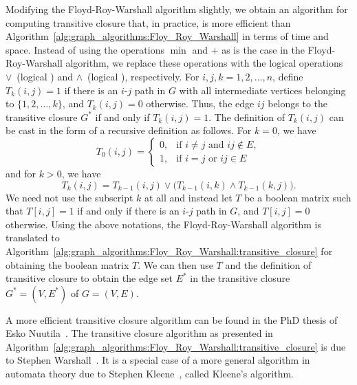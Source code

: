 Modifying the Floyd-Roy-Warshall algorithm slightly, we obtain an
algorithm for computing transitive closure that, in practice, is more
efficient than Algorithm~\ref{alg:graph_algorithms:Floy_Roy_Warshall}
in terms of time and space. Instead of using the operations $\min$ and
$+$ as is the case in the Floyd-Roy-Warshall algorithm, we replace
these operations with the logical operations $\vee$~(logical \OR) and
$\wedge$~(logical \AND), respectively. For $i,j,k = 1, 2, \dots, n$,
define $T_k(i,j) = 1$ if there is an $i$-$j$ path in $G$ with all
intermediate vertices belonging to $\{1, 2, \dots, k\}$, and
$T_k(i,j) = 0$ otherwise. Thus, the edge $ij$ belongs to the
transitive closure $G^*$ if and only if $T_k(i,j) = 1$. The definition
of $T_k(i,j)$ can be cast in the form of a recursive definition as
follows. For $k = 0$, we have
\[
T_0(i,j)
=
\begin{cases}
0, & \text{if $i \neq j$ and $ij \notin E$}, \\
1, & \text{if $i = j$ or $ij \in E$}
\end{cases}
\]
and for $k > 0$, we have
\[
T_k(i,j)
=
T_{k-1}(i,j) \vee \big( T_{k-1}(i,k) \wedge T_{k-1}(k,j) \big).
\]
We need not use the subscript $k$ at all and instead let $T$ be a
boolean matrix such that $T[i,j] = 1$ if and only if there is an
$i$-$j$ path in $G$, and $T[i,j] = 0$ otherwise. Using the above
notations, the Floyd-Roy-Warshall algorithm is translated to
Algorithm~\ref{alg:graph_algorithms:Floy_Roy_Warshall:transitive_closure}
for obtaining the boolean matrix $T$. We can then use $T$ and the
definition of transitive closure to obtain the edge set $E^*$ in the
transitive closure $G^* = (V, E^*)$ of $G = (V, E)$.

A more efficient transitive closure algorithm can be found in the PhD
thesis of Esko Nuutila~\cite{Nuutila1995}. The transitive closure
algorithm as presented in
Algorithm~\ref{alg:graph_algorithms:Floy_Roy_Warshall:transitive_closure}
is due to Stephen Warshall~\cite{Warshall1962}. It is a special case
of a more general algorithm in automata theory due to Stephen
Kleene~\cite{Kleene1956}, called Kleene's algorithm.

